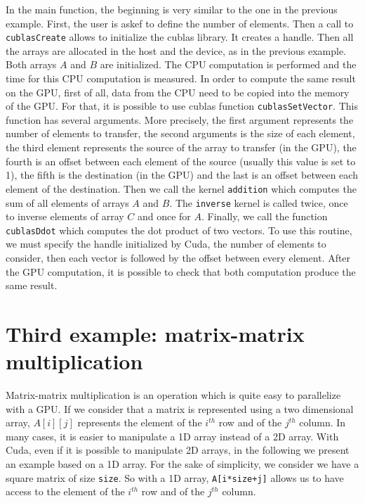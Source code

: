 In the main function,  the beginning is very similar to the  one in the previous
example.  First,  the user is  askef to define  the number of elements.   Then a
call  to \texttt{cublasCreate}  allows  to initialize  the  cublas library.   It
creates a handle. Then all the arrays  are allocated in the host and the device,
as in the  previous example.  Both arrays $A$ and $B$  are initialized.  The CPU
computation is performed  and the time for this CPU  computation is measured. In
order to  compute the same result  on the GPU, first  of all, data  from the CPU
need to be  copied into the memory of  the GPU. For that, it is  possible to use
cublas   function   \texttt{cublasSetVector}.    This   function   has   several
arguments. More precisely, the first  argument represents the number of elements
to transfer, the second arguments is the size of each element, the third element
represents the source  of the array to  transfer (in the GPU), the  fourth is an
offset between each element of the source  (usually this value is set to 1), the
fifth is  the destination (in the  GPU) and the  last is an offset  between each
element  of the  destination. Then  we call  the kernel  \texttt{addition} which
computes the  sum of all elements  of arrays $A$ and  $B$.  The \texttt{inverse}
kernel  is called twice,  once to  inverse elements  of array  $C$ and  once for
$A$. Finally,  we call the  function \texttt{cublasDdot} which computes  the dot
product  of two  vectors.   To use  this  routine, we  must  specify the  handle
initialized by  Cuda, the number  of elements to  consider, then each  vector is
followed by the offset between every  element.  After the GPU computation, it is
possible to check that both computation produce the same result.



\section{Third example: matrix-matrix multiplication}
\label{ch2:3ex}



Matrix-matrix multiplication is an operation  which is quite easy to parallelize
with a GPU. If we consider that  a matrix is represented using a two dimensional
array, $A[i][j]$ represents the element of  the $i^{th}$ row and of the $j^{th}$
column. In  many cases, it is  easier to manipulate a  1D array instead  of a 2D
array.   With Cuda,  even if  it is  possible to  manipulate 2D  arrays,  in the
following we present an example based on a 1D array. For the sake of simplicity,
we  consider we  have  a square  matrix of  size  \texttt{size}.  So  with a  1D
array,  \texttt{A[i*size+j]} allows  us to  have access  to the  element  of the
$i^{th}$ row and of the $j^{th}$ column.

